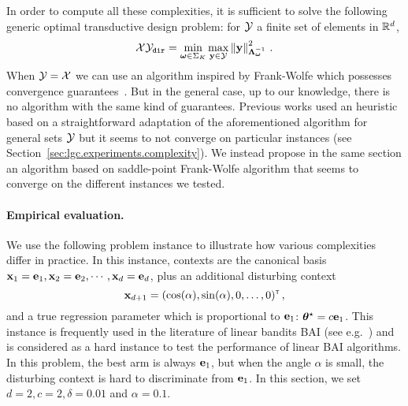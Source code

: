 \begin{remark}
\begin{leftbar}[remarkbar]
In order to compute all these complexities, it is sufficient to solve the following generic optimal transductive design problem: for $\mathcal{Y}$ a finite set of elements in $\mathbb{R}^d$,
\[
\mathcal{X}\mathcal{Y}_{\texttt{dir}}=\min_{{\boldsymbol \omega}\in\Sigma_K}\max_{{\bf y}\in\mathcal{Y}}\left\lVert{\bf y}\right\rVert^2_{{\boldsymbol \Lambda}_{{\boldsymbol \omega}}^{-1}}\,.
\]
When $\mathcal{Y}=\mathcal{X}$ we can use an algorithm inspired by Frank-Wolfe \citep{frank1956algorithm} which possesses convergence guarantees~\citep{atwood1969optimal,ahipasaoglu2008fw}. But in the general case, up to our knowledge, there is no algorithm with the same kind of guarantees. Previous works used an heuristic based on a straightforward adaptation of the aforementioned algorithm for general sets $\mathcal{Y}$ but it seems to not converge on particular instances (see Section~\ref{sec:lgc.experiments.complexity}). We instead propose in the same section an algorithm based on saddle-point Frank-Wolfe algorithm that seems to converge on the different instances we tested.
\end{leftbar}
\end{remark}

\paragraph{Empirical evaluation.}

We use the following problem instance to illustrate how various complexities differ in practice. In this instance, contexts are the canonical basis  ${\bf x}_1 = {\bf e}_1, {\bf x}_2 = {\bf e}_2, \cdots, {\bf x}_d = {\bf e}_d$, plus an additional disturbing context 
\[
    {\bf x}_{d+1} = (\cos(\alpha), \sin(\alpha), 0, \ldots, 0)^\mathsf{\scriptscriptstyle T}\,,
\] 
and a true regression parameter which is proportional to ${\bf e}_1$: ${\boldsymbol \theta}^\star = c{\bf e}_1$. This instance is frequently used in the literature of linear bandits BAI (see e.g.~\citealt{soare2014linear,xu2018linear}) and is considered as a hard instance to test the performance of linear BAI algorithms. In this problem, the best arm is always ${\bf e}_1$, but when the angle $\alpha$ is small, the disturbing context is hard to discriminate from ${\bf e}_1$. In this section, we set $d=2, c=2, \delta=0.01$ and $\alpha=0.1$.

